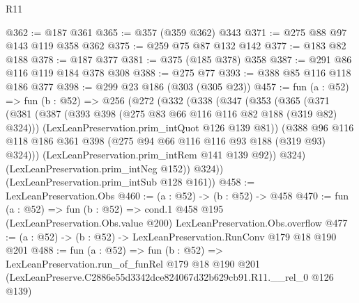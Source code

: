 \begin{lexlean}{R11}
\begin{coremodule}
@362 := @187 @361
@365 := @357 (@359 @362) @343
@371 := @275 @88 @97 @143 @119 @358 @362
@375 := @259 @75 @87 @132 @142
@377 := @183 @82 @188
@378 := @187 @377
@381 := @375 (@185 @378) @358
@387 := @291 @86 @116 @119 @184 @378 @308
@388 := @275 @77
@393 := @388 @85 @116 @118 @186 @377
@398 := @299 @23 @186 (@303 (@305 @23))
@457 := fun (a : @52) =>
  fun (b : @52) =>
  @256
    (@272
      (@332
        (@338
          (@347
            (@353
              (@365
                (@371
                  (@381
                    (@387 (@393 @398 (@275 @83 @66 @116 @116 @82 @188 (@319 @82) @324)))
                    (LexLeanPreservation.prim_intQuot @126 @139 @81))
                  (@388
                    @96
                    @116
                    @118
                    @186
                    @361
                    @398
                    (@275 @94 @66 @116 @116 @93 @188 (@319 @93) @324)))
                (LexLeanPreservation.prim_intRem @141 @139 @92))
              @324)
            (LexLeanPreservation.prim_intNeg @152))
          @324))
      (LexLeanPreservation.prim_intSub @128 @161))
@458 := LexLeanPreservation.Obs
@460 := (a : @52) -> (b : @52) -> @458
@470 := fun (a : @52) =>
  fun (b : @52) =>
  cond.{1} @458 @195 (LexLeanPreservation.Obs.value @200) LexLeanPreservation.Obs.overflow
@477 := (a : @52) -> (b : @52) -> LexLeanPreservation.RunConv @179 @18 @190 @201
@488 := fun (a : @52) =>
  fun (b : @52) =>
  LexLeanPreservation.run_of_funRel
    @179
    @18
    @190
    @201
    (LexLeanPreserve.C2886e55d3342dce824067d32b629cb91.R11.__rel_0 @126 @139)
\end{coremodule}
\end{lexlean}
